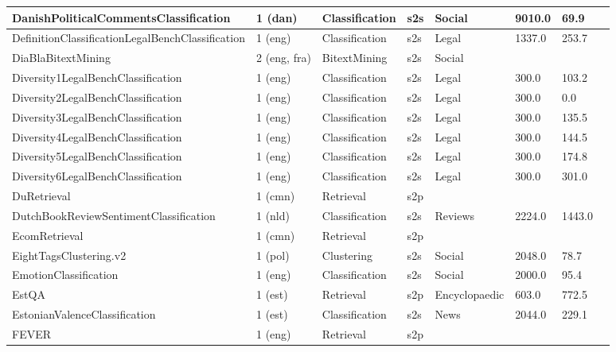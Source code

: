 \begin{longtable}{L{5.0cm}|L{1.5cm}L{1.4cm}L{1.4cm}L{1.4cm}L{1.4cm}L{1.0cm}L{1.0cm}}
 \hline 
DanishPoliticalCommentsClassification \cite{SAMsentiment} & 1 (dan) & Classification & s2s & Social & 9010.0 & 69.9 \\
 \hline 
DefinitionClassificationLegalBenchClassification \cite{guha2023legalbench} & 1 (eng) & Classification & s2s & Legal & 1337.0 & 253.7 \\
 \hline 
DiaBlaBitextMining \cite{gonzalez2019diabla} & 2 (eng, fra) & BitextMining & s2s & Social &  &  \\
 \hline 
Diversity1LegalBenchClassification \cite{guha2023legalbench} & 1 (eng) & Classification & s2s & Legal & 300.0 & 103.2 \\
 \hline 
Diversity2LegalBenchClassification \cite{guha2023legalbench} & 1 (eng) & Classification & s2s & Legal & 300.0 & 0.0 \\
 \hline 
Diversity3LegalBenchClassification \cite{guha2023legalbench} & 1 (eng) & Classification & s2s & Legal & 300.0 & 135.5 \\
 \hline 
Diversity4LegalBenchClassification \cite{guha2023legalbench} & 1 (eng) & Classification & s2s & Legal & 300.0 & 144.5 \\
 \hline 
Diversity5LegalBenchClassification \cite{guha2023legalbench} & 1 (eng) & Classification & s2s & Legal & 300.0 & 174.8 \\
 \hline 
Diversity6LegalBenchClassification \cite{guha2023legalbench} & 1 (eng) & Classification & s2s & Legal & 300.0 & 301.0 \\
 \hline 
DuRetrieval \cite{qiu2022dureaderretrieval} & 1 (cmn) & Retrieval & s2p &  &  &  \\
 \hline 
DutchBookReviewSentimentClassification \cite{DBLP:journals/corr/abs-1910-00896} & 1 (nld) & Classification & s2s & Reviews & 2224.0 & 1443.0 \\
 \hline 
EcomRetrieval  & 1 (cmn) & Retrieval & s2p &  &  &  \\
 \hline 
EightTagsClustering.v2 \cite{dadas-etal-2020-evaluation} & 1 (pol) & Clustering & s2s & Social & 2048.0 & 78.7 \\
 \hline 
EmotionClassification \cite{saravia-etal-2018-carer} & 1 (eng) & Classification & s2s & Social & 2000.0 & 95.4 \\
 \hline 
EstQA \cite{mastersthesis} & 1 (est) & Retrieval & s2p & Encyclopaedic & 603.0 & 772.5 \\
 \hline 
EstonianValenceClassification \cite{Pajupuu2023} & 1 (est) & Classification & s2s & News & 2044.0 & 229.1 \\
 \hline 
FEVER \cite{thorne-etal-2018-fever} & 1 (eng) & Retrieval & s2p &  &  &  \\

\end{longtable}
